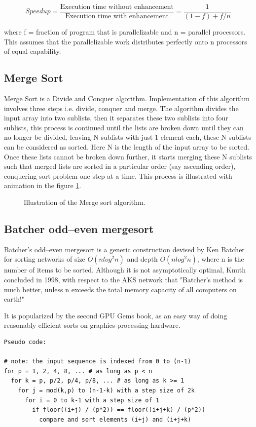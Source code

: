 \documentclass{article}
\begin{document}
\[Speedup = \frac{\text{Execution time without enhancement}}{\text{Execution time with enhancement}} = \frac{1}{(1-f)+f/n} \]

where f = fraction of program that is parallelizable and n = parallel processors. This assumes that the parallelizable work distributes perfectly onto n processors of equal capability.

\subsection{Merge Sort}
Merge Sort is a Divide and Conquer algorithm. Implementation of this algorithm involves three steps i.e. divide, conquer and merge. The algorithm divides the input array into two sublists, then it separates these two sublists into four sublists, this process is continued until the lists are broken down until they can no longer be divided, leaving N sublists with just 1 element each, these N sublists can be considered as sorted. Here N is the length of the input array to be sorted.
Once these lists cannot be broken down further, it starts merging these N sublists such that merged lists are sorted in a particular order (say ascending order), conquering sort problem one step at a time. This process is illustrated with animation in the figure \ref{fig:merge_serial}.

\begin{figure}[H]
\centering
\caption{\label{fig:merge_serial}Illustration of the Merge sort algorithm.}
\end{figure}

\subsection{Batcher odd–even mergesort}
\label{subsec:Batcher odd–even mergesort}
Batcher's odd–even mergesort is a generic construction devised by Ken Batcher for sorting networks of size $O(nlog^2n)$ and depth $O(nlog^2n)$, where n is the number of items to be sorted\cite{wiki:001}\cite{art1}. Although it is not asymptotically optimal, Knuth concluded in 1998, with respect to the AKS network that "Batcher's method is much better, unless n exceeds the total memory capacity of all computers on earth!"

It is popularized by the second GPU Gems book, as an easy way of doing reasonably efficient sorts on graphics-processing hardware.

\begin{lstlisting}
Pseudo code:

# note: the input sequence is indexed from 0 to (n-1)
for p = 1, 2, 4, 8, ... # as long as p < n
  for k = p, p/2, p/4, p/8, ... # as long as k >= 1
    for j = mod(k,p) to (n-1-k) with a step size of 2k
      for i = 0 to k-1 with a step size of 1
        if floor((i+j) / (p*2)) == floor((i+j+k) / (p*2))
          compare and sort elements (i+j) and (i+j+k)
\end{lstlisting}
\end{document}
